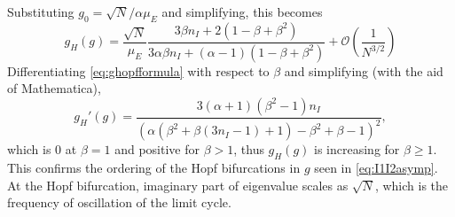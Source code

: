 \documentclass[11pt,reqno]{amsart}
\begin{document}
Substituting $g_0 = \sqrt{N}/\alpha \mu_{E}$ and simplifying, this becomes
\begin{equation}\label{eq:ghopfformula}
g_H(g) = 
\frac{\sqrt{N}}{\mu_E} 
\frac{ 3 \beta n_I  + 2(1 - \beta + \beta^2 ) }
{ 3 \alpha \beta n_I + (\alpha - 1)(1 - \beta + \beta^2 ) }
+ \mathcal{O}\left( \frac{1}{N^{3/2}} \right)
\end{equation}
Differentiating \cref{eq:ghopfformula} with respect to $\beta$ and simplifying (with the aid of Mathematica),
\begin{equation}
g_H'(g) = 
    \frac{ 
    3 (\alpha+1) \left(\beta^2-1\right) n_I
    }
    {
    \left(\alpha \left(\beta^2+\beta (3 n_I -1)+1\right)-\beta^2+\beta-1\right)^2},
\end{equation}
which is 0 at $\beta = 1$ and positive for $\beta > 1$, thus $g_H(g)$ is increasing for $\beta \geq 1$. This confirms the ordering of the Hopf bifurcations in $g$ seen in \cref{eq:I1I2asymp}. At the Hopf bifurcation, imaginary part of eigenvalue scales as $\sqrt{N}$, which is the frequency of oscillation of the limit cycle.
\end{document}
